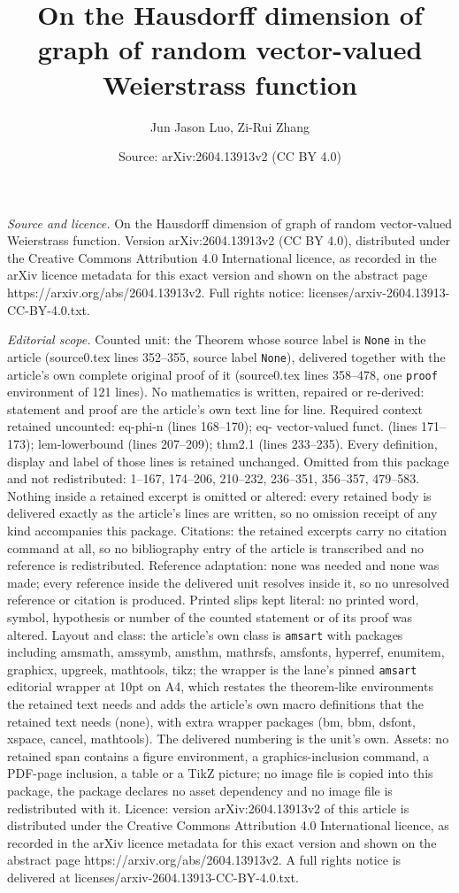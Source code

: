 \documentclass[10pt,a4paper]{amsart}
\title[On the Hausdorff dimension of graph of random vector-valued ]{On the Hausdorff dimension of graph of random vector-valued Weierstrass function}
\author{Jun Jason Luo, Zi-Rui Zhang}
\date{Source: arXiv:2604.13913v2 (CC BY 4.0)}
\begin{document}
\maketitle

\noindent\emph{Source and licence.} On the Hausdorff dimension of graph of random vector-valued Weierstrass function. Version arXiv:2604.13913v2 (CC BY 4.0), distributed under the Creative Commons Attribution 4.0 International licence, as recorded in the arXiv licence metadata for this exact version and shown on the abstract page https://arxiv.org/abs/2604.13913v2. Full rights notice: licenses/arxiv-2604.13913-CC-BY-4.0.txt.\par\smallskip

\noindent\textit{Editorial scope.} Counted unit: the Theorem whose source label is \texttt{None} in the article (source0.tex lines 352--355, source label \texttt{None}), delivered together with the article's own complete original proof of it (source0.tex lines 358--478, one \texttt{proof} environment of 121 lines). No mathematics is written, repaired or re-derived: statement and proof are the article's own text line for line. Required context retained uncounted: eq-phi-n (lines 168--170); eq- vector-valued funct. (lines 171--173); lem-lowerbound (lines 207--209); thm2.1 (lines 233--235). Every definition, display and label of those lines is retained unchanged. Omitted from this package and not redistributed: 1--167, 174--206, 210--232, 236--351, 356--357, 479--583. Nothing inside a retained excerpt is omitted or altered: every retained body is delivered exactly as the article's lines are written, so no omission receipt of any kind accompanies this package. Citations: the retained excerpts carry no citation command at all, so no bibliography entry of the article is transcribed and no reference is redistributed. Reference adaptation: none was needed and none was made; every reference inside the delivered unit resolves inside it, so no unresolved reference or citation is produced. Printed slips kept literal: no printed word, symbol, hypothesis or number of the counted statement or of its proof was altered. Layout and class: the article's own class is \texttt{amsart} with packages including amsmath, amssymb, amsthm, mathrsfs, amsfonts, hyperref, enumitem, graphicx, upgreek, mathtools, tikz; the wrapper is the lane's pinned \texttt{amsart} editorial wrapper at 10pt on A4, which restates the theorem-like environments the retained text needs and adds the article's own macro definitions that the retained text needs (none), with extra wrapper packages (bm, bbm, dsfont, xspace, cancel, mathtools). The delivered numbering is the unit's own. Assets: no retained span contains a figure environment, a graphics-inclusion command, a PDF-page inclusion, a table or a TikZ picture; no image file is copied into this package, the package declares no asset dependency and no image file is redistributed with it. Licence: version arXiv:2604.13913v2 of this article is distributed under the Creative Commons Attribution 4.0 International licence, as recorded in the arXiv licence metadata for this exact version and shown on the abstract page https://arxiv.org/abs/2604.13913v2. A full rights notice is delivered at licenses/arxiv-2604.13913-CC-BY-4.0.txt. 
\end{document}
